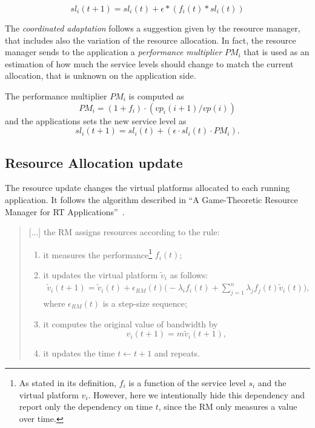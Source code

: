 \documentclass[nobiblatex]{LTHthesis}
\begin{document}
\begin{equation}
sl_i(t+1)= sl_i(t) + \epsilon*(f_i(t)*sl_i(t))
\end{equation}

The \emph{coordinated adaptation} follows a suggestion given by the resource
manager, that includes also the variation of the resource allocation. In fact,
the resource manager sends to the application a \emph{performance multiplier}
$PM_i$ that is used as an estimation of how much the service levels should
change to match the current allocation, that is unknown on the application
side.

The performance multiplier $PM_i$ is computed as
\begin{equation}
PM_i = (1+f_i) \cdot (vp_i(i+1)/vp(i))
\end{equation}
and the applications sets the new service level as
\begin{equation}
sl_i(t+1) = sl_i(t) + (\epsilon \cdot sl_i(t) \cdot PM_i).
\end{equation}

\subsection{Resource Allocation update}

The resource update changes the virtual platforms allocated to each running
application. It follows the algorithm described in 
``A Game-Theoretic Resource Manager for RT Applications''~\cite[page 4]{gtrm}.

\begin{quotation}
	[...] the RM assigns resources according to the rule:
	\begin{enumerate}
	\item it measures the performance\footnote{As stated in its definition, 
    $f_i$ is a function of the service level $s_i$ and the virtual platform 
    $v_i$. However, here we intentionally hide this dependency and report 
    only the dependency on time $t$, since the RM only measures a value 
    over time.} $f_i(t)$;  
	\item it updates the virtual platform $\tilde{v}_{i}$ as follows:
		\begin{multline}
		  \tilde{v}_i(t+1) = \tilde{v}_i(t) + 
                         \epsilon_{ RM}(t)\Big(- \lambda_i f_i(t) + 
                         \sum_{j=1}^n \lambda_j f_j(t) \tilde{v}_i(t)\Big),
		  \label{eq:RecursionForResources}
		\end{multline}
		where $\epsilon_{ RM}(t)$ is a step-size sequence;
	\item it computes the original value of bandwidth by 
    $$v_i(t+1) = m \tilde{v}_i(t+1),$$
	\item it updates the time $t\leftarrow t+1$ and repeats.
	\end{enumerate}
\end{quotation}
\end{document}
